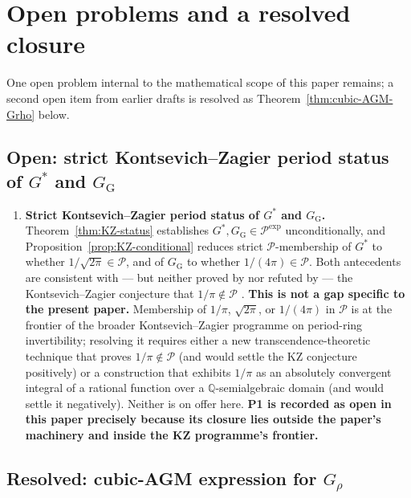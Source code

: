 \documentclass[11pt]{article}
\theoremstyle{definition}
\theoremstyle{remark}
\newcommand{\Gs}{G^{*}}
\newcommand{\GG}{G_{\!\scriptscriptstyle\mathrm{G}}}
\newcommand{\Q}{\mathbb{Q}}
\begin{document}
\section{Open problems and a resolved closure}\label{sec:open}

One open problem internal to the mathematical scope of this paper
remains; a second open item from earlier drafts is resolved as
Theorem~\ref{thm:cubic-AGM-Grho} below.

\subsection{Open: strict Kontsevich--Zagier period status of $\Gs$ and $\GG$}\label{sec:p1-open}

\begin{enumerate}[label=\textbf{P\arabic*.}, leftmargin=*, itemsep=4pt]

\item \textbf{Strict Kontsevich--Zagier period status of $\Gs$ and $\GG$.}
Theorem~\ref{thm:KZ-status} establishes $\Gs, \GG \in \mathcal{P}^{\exp}$
unconditionally, and Proposition~\ref{prop:KZ-conditional} reduces
strict $\mathcal{P}$-membership of $\Gs$ to whether $1/\sqrt{2\pi} \in
\mathcal{P}$, and of $\GG$ to whether $1/(4\pi) \in \mathcal{P}$. Both
antecedents are consistent with --- but neither proved by nor refuted
by --- the Kontsevich--Zagier conjecture that $1/\pi \notin \mathcal{P}$
\cite[Problem~3]{kontsevich-zagier}. \textbf{This is not a gap specific
to the present paper.} Membership of $1/\pi$, $\sqrt{2\pi}$, or
$1/(4\pi)$ in $\mathcal{P}$ is at the frontier of the broader
Kontsevich--Zagier programme on period-ring invertibility; resolving it
requires either a new transcendence-theoretic technique that proves
$1/\pi \notin \mathcal{P}$ (and would settle the KZ conjecture
positively) or a construction that exhibits $1/\pi$ as an absolutely
convergent integral of a rational function over a $\Q$-semialgebraic
domain (and would settle it negatively). Neither is on offer here.
\textbf{P1 is recorded as open in this paper precisely because its
closure lies outside the paper's machinery and inside the KZ
programme's frontier.}

\end{enumerate}

\subsection{Resolved: cubic-AGM expression for $G_\rho$}\label{sec:p2-closed}
\end{document}
